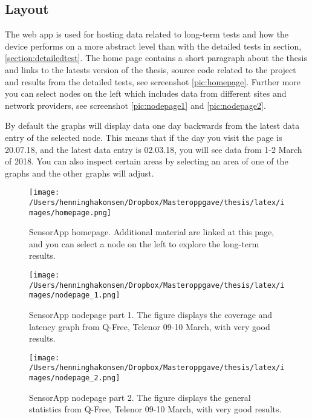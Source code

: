 \documentclass[USenglish]{ifimaster}  %
\begin{document}
\subsection{Layout} \label{sssection:layout}
The web app is used for hosting data related to long-term tests and how the device performs on a more abstract level than with the detailed tests in section, \vref{section:detailedtest}. The home page contains a short paragraph about the thesis and links to the latests version of the thesis, source code related to the project and results from the detailed tests, see screenshot \vref{pic:homepage}. Further more you can select nodes on the left which includes data from different sites and network providers, see screenshot \vref{pic:nodepage1} and \vref{pic:nodepage2}.

By default the graphs will display data one day backwards from the latest data entry of the selected node. This means that if the day you visit the page is 20.07.18, and the latest data entry is 02.03.18, you will see data from 1-2 March of 2018. You can also inspect certain areas by selecting an area of one of the graphs and the other graphs will adjust.

\begin{figure}[H]
  \centering
  \texttt{[image: /Users/henninghakonsen/Dropbox/Masteroppgave/thesis/latex/images/homepage.png]}
  \caption[SensorApp homepage]{SensorApp homepage. Additional material are linked at this page, and you can select a node on the left to explore the long-term results.}
  \label{pic:homepage}
\end{figure}

\begin{figure}[H]
  \centering
  \texttt{[image: /Users/henninghakonsen/Dropbox/Masteroppgave/thesis/latex/images/nodepage\_1.png]}
  \caption[SensorApp nodepage part 1]{SensorApp nodepage part 1. The figure displays the coverage and latency graph from Q-Free, Telenor 09-10 March, with very good results.}
  \label{pic:nodepage1}
\end{figure}

\begin{figure}[H]
  \centering
  \texttt{[image: /Users/henninghakonsen/Dropbox/Masteroppgave/thesis/latex/images/nodepage\_2.png]}
  \caption[SensorApp nodepage part 2]{SensorApp nodepage part 2. The figure displays the general statistics from Q-Free, Telenor 09-10 March, with very good results.}
  \label{pic:nodepage2}
\end{figure}
\end{document}
